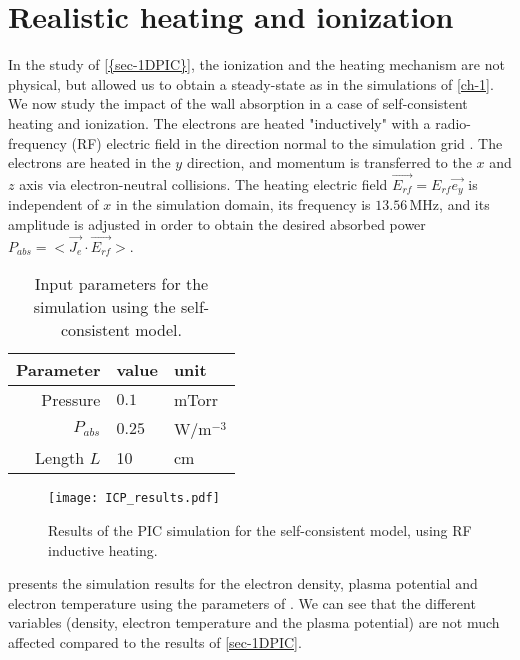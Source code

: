 
\section{Realistic heating and ionization}
  \label{sec-realistic_1D}
  In the study of \cref{{sec-1DPIC}}, the ionization and the heating mechanism are not physical, but allowed us to obtain a steady-state as in the simulations of \cref{ch-1}.
  We now study the impact of the wall absorption in a case of self-consistent heating and ionization.
  The electrons are heated "inductively" with a radio-frequency (RF) electric field in the direction normal to the simulation grid \cite{meige2006a, lucken2018, turner1993}.
  The electrons are heated in the $y$ direction, and momentum is transferred to the $x$ and $z$ axis via electron-neutral collisions.
  The heating electric field $\vec{E_{rf}} = E_{rf} \vec{e_y}$ is independent of $x$ in the simulation domain, its frequency is $13.56$\,MHz, and its amplitude is adjusted in order to obtain the desired absorbed power $P_{abs} = < \vec{J_e} \cdot  \vec{E_{rf}}>$.
  


  \begin{table}[!htb]
    \centering
    \begin{tabular}{@{} r l l @{}}
    \toprule
      Parameter & value & unit \\ \midrule
      Pressure & $0.1$ & mTorr\\
      $P_{abs}$ & $0.25$ & W/m$^{-3}$\\
      Length $L$&10&cm\\
      \bottomrule
    \end{tabular}
    \caption{Input parameters for the simulation using the self-consistent model.}
    \label{tab-PIC2}
  \end{table}

  \begin{figure}[!htbp]
    \center
    \texttt{[image: ICP\_results.pdf]}
    \caption{Results of the PIC simulation for the self-consistent model, using RF inductive heating.}
    \label{fig-icpresults}
  \end{figure}

   presents the simulation results for the electron density, plasma potential and electron temperature using the parameters of .
  We can see that the different variables (density, electron temperature and the plasma potential) are not much affected compared to the results of \cref{sec-1DPIC}.


